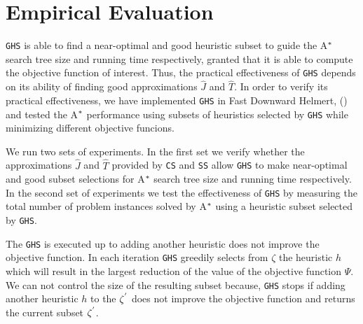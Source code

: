 



\chapter{Empirical Evaluation}\label{ch:empirical_evaluation}
\noindent
\texttt{GHS} is able to find a near-optimal and good heuristic subset to guide the A$\sp{*}$ search tree size and running time respectively, granted that it is able to compute the objective function of interest. Thus, the practical effectiveness of \texttt{GHS} depends on its ability of finding good approximations $\hat{J}$ and $\hat{T}$. In order to verify its practical effectiveness, we have implemented \texttt{GHS} in Fast Downward Helmert, (\citeyear{helmert2006fast}) and tested the A$\sp{*}$ performance using subsets of heuristics selected by \texttt{GHS} while minimizing different objective funcions.

We run two sets of experiments. In the first set we verify whether the approximations $\hat{J}$ and $\hat{T}$ provided by \texttt{CS} and \texttt{SS} allow \texttt{GHS} to make near-optimal and good subset selections for A$\sp{*}$ search tree size and running time respectively. In the second set of experiments we test the effectiveness of \texttt{GHS} by measuring the total number of problem instances solved by A$\sp{*}$ using a heuristic subset selected by \texttt{GHS}.

The \texttt{GHS} is executed up to adding another heuristic does not improve the objective function. In each iteration \texttt{GHS} greedily selects from $\zeta$ the heuristic $h$ which will result in the largest reduction of the value of the objective function $\Psi$. We can not control the size of the resulting subset because, \texttt{GHS} stops if adding another heuristic $h$ to the $\zeta\sp{'}$ does not improve the objective function and returns the current subset $\zeta\sp{'}$.

